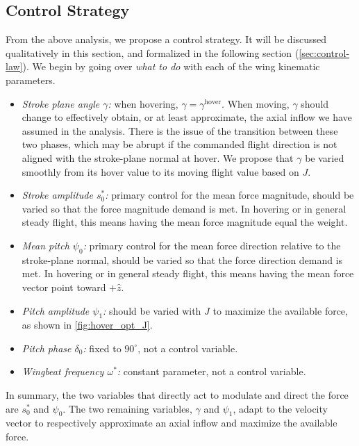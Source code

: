 \documentclass[11pt,letterpaper]{article}
\begin{document}
\subsection{Control Strategy}\label{sec:strategy}

From the above analysis, we propose a control strategy.
It will be discussed qualitatively in this section,
and formalized in the following section (\autoref{sec:control-law}).
We begin by going over \emph{what to do} with each of the
wing kinematic parameters.
\begin{itemize}
    \item \emph{Stroke plane angle $\gamma$:} when hovering,
        $\gamma = \gamma^\text{hover}$. When moving, $\gamma$
        should change to effectively obtain, or at least
        approximate, the axial inflow we have assumed in the analysis.
        There is the issue of the transition between these
        two phases, which may be abrupt if the commanded
        flight direction is not aligned with the stroke-plane normal
        at hover. We propose that $\gamma$ be varied smoothly from
        its hover value to its moving flight value based on $J$.
    \item \emph{Stroke amplitude $s_0^*$:} primary control
        for the mean force magnitude, should be varied so that
        the force magnitude demand is met. In hovering or in general steady flight,
        this means having the mean force magnitude equal the weight.
    \item \emph{Mean pitch $\psi_0$:} primary control
        for the mean force direction relative to the stroke-plane
        normal, should be varied so that the force direction demand
        is met. In hovering or in general steady flight,
        this means having the mean force vector point toward $+\hat{z}$.
    \item \emph{Pitch amplitude $\psi_1$:} should be varied with
        $J$ to maximize the available force, as shown in \autoref{fig:hover_opt_J}.
    \item \emph{Pitch phase $\delta_0$:} fixed to $90^\circ$, not a control variable.
    \item \emph{Wingbeat frequency $\omega^*$:} constant parameter, not a control variable.
\end{itemize}
In summary, the two variables that directly act to
modulate and direct the force are $s_0^*$ and $\psi_0$.
The two remaining variables, $\gamma$ and $\psi_1$,
adapt to the velocity vector to respectively
approximate an axial inflow and maximize the
available force.
\end{document}
